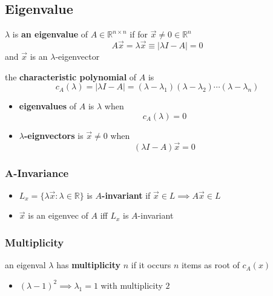 	\subsection{Eigenvalue}
	    \begin{definition}[$\lambda$]
			$\lambda$ is \textbf{an eigenvalue} of $A\in\mathbb{R}^{n\times n}$ if for $\vec x\ne0\in\mathbb{R}^n$
			$$A\vec x=\lambda\vec x\equiv|\lambda I-A|=0$$
			and $\vec x$ is an $\lambda$-eigenvector
	    \end{definition}
		\begin{definition}[$c_A(\lambda)$]
			the \textbf{characteristic polynomial} of $A$ is 
			$$c_A(\lambda)=|\lambda I-A|=(\lambda-\lambda_1)(\lambda-\lambda_2)\cdots(\lambda-\lambda_n)$$
			\begin{itemize}
				\item \textbf{eigenvalues} of $A$ is $\lambda$ when
					$$c_A(\lambda)=0$$
				\item $\lambda$\textbf{-eignvectors} is $\vec x\ne0$ when
					$$(\lambda I-A)\vec x=0$$
			\end{itemize}
		\end{definition}
		\subsubsection{A-Invariance}
		    \begin{definition}
				\begin{itemize}
					\item $L_x=\{\lambda\vec x:\lambda\in\mathbb{R}\}$ is \textbf{$A$-invariant} if $\vec x\in L\implies A\vec x\in L$
					\item $\vec x$ is an eigenvec of $A$ iff $L_x$ is $A$-invariant
				\end{itemize}
		    \end{definition}
		\subsubsection{Multiplicity}
		    \begin{definition}
				an eigenval $\lambda$ has \textbf{multiplicity} $n$ if it occurs $n$ items as root of $c_A(x)$
				\begin{itemize}
					\item $(\lambda-1)^2\implies\lambda_1=1$ with multiplicity $2$
				\end{itemize}
		    \end{definition}
